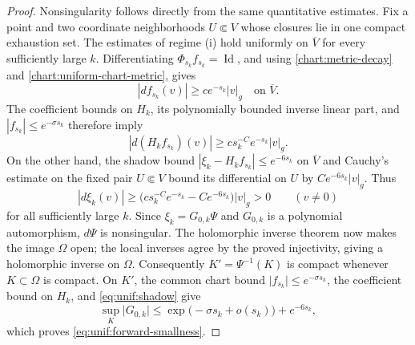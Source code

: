 \documentclass[11pt]{article}
\theoremstyle{definition}
\theoremstyle{remark}
\DeclareMathOperator{\Id}{Id}
\newcommand{\abs}[1]{\lvert#1\rvert}
\numberwithin{equation}{section}
\begin{document}
\begin{proof}
Nonsingularity follows directly from the same quantitative estimates.
Fix a point and two coordinate neighborhoods $U\Subset V$ whose
closures lie in one compact exhaustion set.  The estimates of
regime (i) hold uniformly on $\overline V$ for every sufficiently
large $k$.  Differentiating $\Phi_{s_k}f_{s_k}=\Id$, and using
\eqref{chart:metric-decay} and
\eqref{chart:uniform-chart-metric}, gives
\[
 |df_{s_k}(v)|\ge c e^{-s_k}|v|_g
 \quad\text{on }\overline V.
\]
The coefficient bounds on $H_k$, its polynomially bounded inverse
linear part, and $|f_{s_k}|\le e^{-\sigma s_k}$ therefore imply
\[
 |d(H_kf_{s_k})(v)|\ge c s_k^{-C}e^{-s_k}|v|_g.
\]
On the other hand, the shadow bound
$|\xi_k-H_kf_{s_k}|\le e^{-6s_k}$ on $\overline V$ and Cauchy's
estimate on the fixed pair $U\Subset V$ bound its differential on
$U$ by $C e^{-6s_k}|v|_g$.  Thus
\[
 |d\xi_k(v)|\ge
 \bigl(c s_k^{-C}e^{-s_k}-C e^{-6s_k}\bigr)|v|_g>0
 \qquad(v\ne0)
\]
for all sufficiently large $k$.  Since $\xi_k=G_{0,k}\Psi$ and
$G_{0,k}$ is a polynomial automorphism, $d\Psi$ is nonsingular.
The holomorphic inverse theorem now makes the image $\Omega$ open;
the local inverses agree by the proved injectivity, giving a
holomorphic inverse on $\Omega$.  Consequently
$K'=\Psi^{-1}(K)$ is compact whenever $K\subset\Omega$ is compact.  On $K'$, the common chart bound
$\abs{f_{s_k}}\le e^{-\sigma s_k}$, the coefficient bound on $H_k$,
and \eqref{eq:unif:shadow} give
\[
 \sup_K\abs{G_{0,k}}
 \le \exp\bigl(-\sigma s_k+o(s_k)\bigr)+e^{-6s_k},
\]
which proves \eqref{eq:unif:forward-smallness}.


\end{proof}
\end{document}
